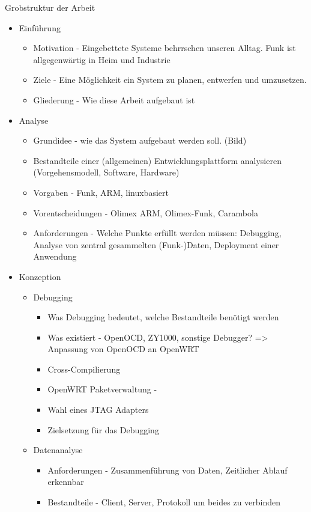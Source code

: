 Grobstruktur der Arbeit
\begin{itemize}
  \item Einführung
  \begin{itemize}
    \item Motivation - Eingebettete Systeme behrrschen unseren Alltag. Funk ist
    allgegenwärtig in Heim und Industrie
    \item Ziele - Eine Möglichkeit ein System zu planen, entwerfen und
    umzusetzen.
    \item Gliederung - Wie diese Arbeit aufgebaut ist
  \end{itemize}
  \item Analyse
  \begin{itemize}
    \item Grundidee - wie das System aufgebaut werden soll. (Bild)
    \item Bestandteile einer (allgemeinen) Entwicklungsplattform analysieren
    (Vorgehensmodell, Software, Hardware)
    \item Vorgaben - Funk, ARM, linuxbasiert
    \item Vorentscheidungen - Olimex ARM, Olimex-Funk, Carambola
    \item Anforderungen - Welche Punkte erfüllt werden müssen: Debugging,
    Analyse von zentral gesammelten (Funk-)Daten, Deployment einer Anwendung
  \end{itemize}
  \item Konzeption
  \begin{itemize}
    \item Debugging
    \begin{itemize}
      \item Was Debugging bedeutet, welche Bestandteile benötigt werden
      \item Was existiert - OpenOCD, ZY1000, sonstige
      Debugger? => Anpassung von OpenOCD an OpenWRT
      \item Cross-Compilierung
      \item OpenWRT Paketverwaltung - 
      \item Wahl eines JTAG Adapters
      \item Zielsetzung für das Debugging
  	\end{itemize}
  	\item Datenanalyse
  	\begin{itemize}
  	  \item Anforderungen - Zusammenführung von Daten, Zeitlicher Ablauf
  	  erkennbar
  	  \item Bestandteile - Client, Server, Protokoll um beides zu verbinden

\end{itemize}
\end{itemize}
\end{itemize}

